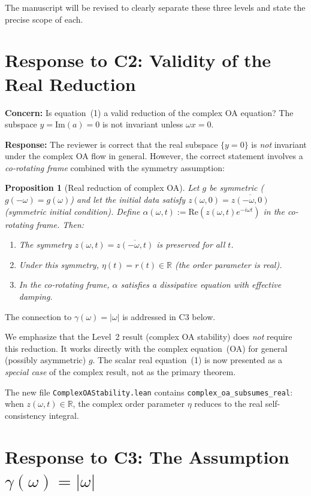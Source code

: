 \documentclass[11pt]{article}
\newcommand{\R}{\mathbb{R}}
\theoremstyle{plain}
\newtheorem{proposition}[theorem]{Proposition}
\begin{document}
The manuscript will be revised to clearly separate these three levels and state the precise scope of each.

\section*{Response to C2: Validity of the Real Reduction}

\textbf{Concern:} Is equation~(1) a valid reduction of the complex OA equation? The subspace $y = \mathrm{Im}(a) = 0$ is not invariant unless $\omega x = 0$.

\textbf{Response:} The reviewer is correct that the real subspace $\{y = 0\}$ is \emph{not} invariant under the complex OA flow in general. However, the correct statement involves a \emph{co-rotating frame} combined with the symmetry assumption:

\begin{proposition}[Real reduction of complex OA]
Let $g$ be symmetric ($g(-\omega) = g(\omega)$) and let the initial data satisfy $z(\omega, 0) = \overline{z(-\omega, 0)}$ (symmetric initial condition). Define $\alpha(\omega, t) := \mathrm{Re}(z(\omega, t) e^{-i\omega t})$ in the co-rotating frame. Then:
\begin{enumerate}
\item The symmetry $z(\omega,t) = \overline{z(-\omega,t)}$ is preserved for all $t$.
\item Under this symmetry, $\eta(t) = r(t) \in \R$ (the order parameter is real).
\item In the co-rotating frame, $\alpha$ satisfies a dissipative equation with effective damping.
\end{enumerate}
\end{proposition}

The connection to $\gamma(\omega) = |\omega|$ is addressed in C3 below.

We emphasize that the Level~2 result (complex OA stability) does \emph{not} require this reduction. It works directly with the complex equation~(OA) for general (possibly asymmetric) $g$. The scalar real equation~(1) is now presented as a \emph{special case} of the complex result, not as the primary theorem.

The new file \texttt{ComplexOAStability.lean} contains \texttt{complex\_oa\_subsumes\_real}: when $z(\omega,t) \in \R$, the complex order parameter $\eta$ reduces to the real self-consistency integral.

\section*{Response to C3: The Assumption $\gamma(\omega) = |\omega|$}
\end{document}
